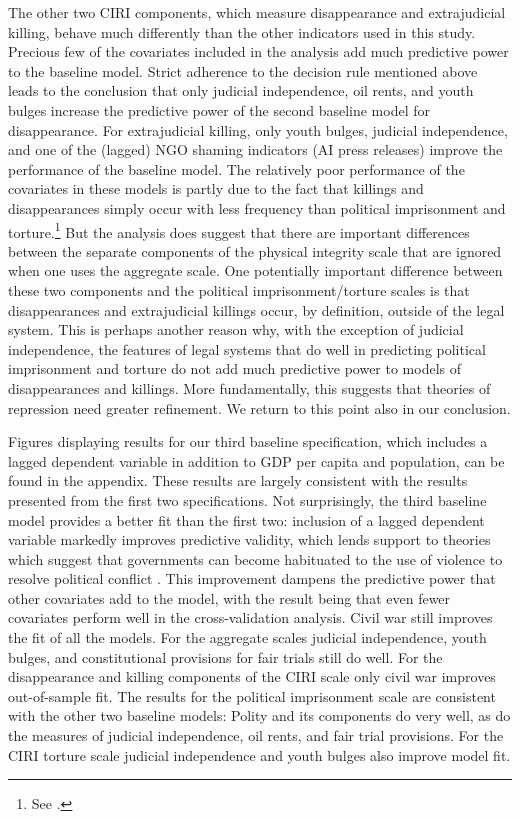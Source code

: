 \documentclass[11pt]{article}
\begin{document}
The other two CIRI components, which measure disappearance and extrajudicial killing, behave much differently than the other indicators used in this study. Precious few of the covariates included in the analysis add much predictive power to the baseline model. Strict adherence to the decision rule mentioned above leads to the conclusion that only judicial independence, oil rents, and youth bulges increase the predictive power of the second baseline model for disappearance. For extrajudicial killing, only youth bulges, judicial independence, and one of the (lagged) NGO shaming indicators (AI press releases) improve the performance of the baseline model. The relatively poor performance of the covariates in these models is partly due to the fact that killings and disappearances simply occur with less frequency than political imprisonment and torture.\footnote{See \citet{CingranelliRichards1999isq}.} But the analysis does suggest that there are important differences between the separate components of the physical integrity scale that are ignored when one uses the aggregate scale. One potentially important difference between these two components and the political imprisonment/torture scales is that disappearances and extrajudicial killings occur, by definition, outside of the legal system. This is perhaps another reason why, with the exception of judicial independence, the features of legal systems that do well in predicting political imprisonment and torture do not add much predictive power to models of disappearances and killings. More fundamentally, this suggests that theories of repression need greater refinement. We return to this point also in our conclusion.

Figures displaying results for our third baseline specification, which includes a lagged dependent variable in addition to GDP per capita and population, can be found in the appendix. These results are largely consistent with the results presented from the first two specifications. Not surprisingly, the third baseline model provides a better fit than the first two: inclusion of a lagged dependent variable markedly improves predictive validity, which lends support to theories which suggest that governments can become habituated to the use of violence to resolve political conflict \citep{Gurr1988}. This improvement dampens the predictive power that other covariates add to the model, with the result being that even fewer covariates perform well in the cross-validation analysis. Civil war still improves the fit of all the models. For the aggregate scales judicial independence, youth bulges, and constitutional provisions for fair trials still do well. For the disappearance and killing components of the CIRI scale only civil war improves out-of-sample fit. The results for the political imprisonment scale are consistent with the other two baseline models: Polity and its components do very well, as do the measures of judicial independence, oil rents, and fair trial provisions. For the CIRI torture scale judicial independence and youth bulges also improve model fit. 
\end{document}
